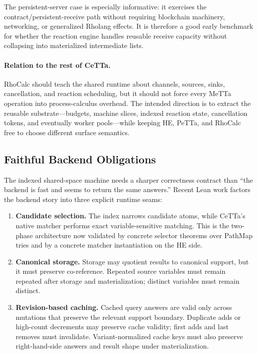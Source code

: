 \documentclass[11pt]{article}
\newcommand{\PeTTa}{\textup{PeTTa}}
\newcommand{\HE}{\textup{HE}}
\newcommand{\CeTTa}{\textup{CeTTa}}
\newcommand{\PathMap}{\textup{PathMap}}
\newcommand{\RhoCalc}{\textup{RhoCalc}}
\begin{document}
The persistent-server case is especially informative: it exercises the
contract/persistent-receive path without requiring blockchain machinery,
networking, or generalized Rholang effects.  It is therefore a good early
benchmark for whether the reaction engine handles reusable receive capacity
without collapsing into materialized intermediate lists.

\paragraph{Relation to the rest of \CeTTa{}.}
\RhoCalc{} should teach the shared runtime about channels, sources, sinks,
cancellation, and reaction scheduling, but it should not force every MeTTa
operation into process-calculus overhead.  The intended direction is to extract
the reusable substrate---budgets, machine slices, indexed reaction state,
cancellation tokens, and eventually worker pools---while keeping \HE{},
\PeTTa{}, and \RhoCalc{} free to choose different surface semantics.

\subsection{Faithful Backend Obligations}

The indexed shared-space machine needs a sharper correctness contract than
``the backend is fast and seems to return the same answers.''  Recent Lean
work factors the backend story into three explicit runtime seams:
\begin{enumerate}
\item \textbf{Candidate selection.}
  The index narrows candidate atoms, while \CeTTa{}'s native matcher performs
  exact variable-sensitive matching.  This is the two-phase architecture now
  validated by concrete selector theorems over \PathMap{} tries and by a
  concrete matcher instantiation on the \HE{} side.
\item \textbf{Canonical storage.}
  Storage may quotient results to canonical support, but it must preserve
  co-reference.  Repeated source variables must remain repeated after storage
  and materialization; distinct variables must remain distinct.
\item \textbf{Revision-based caching.}
  Cached query answers are valid only across mutations that preserve the
  relevant support boundary.  Duplicate adds or high-count decrements may
  preserve cache validity; first adds and last removes must invalidate.
  Variant-normalized cache keys must also preserve right-hand-side answers and
  result shape under materialization.
\end{enumerate}
\end{document}
